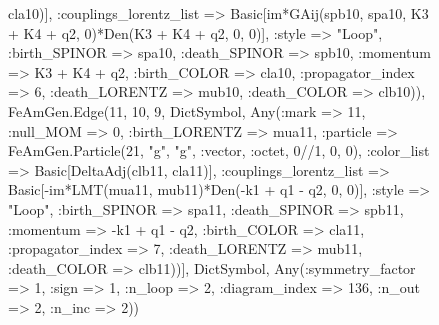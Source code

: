 \documentclass{revtex4}
\begin{document}
\begin{figure}[!htb]
\begin{center}
{cla10)], :couplings_lorentz_list => Basic[im*GAij(spb10, spa10, K3 + K4 + q2, 0)*Den(K3 + K4 + q2, 0, 0)], :style => "Loop", :birth_SPINOR => spa10, :death_SPINOR => spb10, :momentum => K3 + K4 + q2, :birth_COLOR => cla10, :propagator_index => 6, :death_LORENTZ => mub10, :death_COLOR => clb10)), FeAmGen.Edge(11, 10, 9, Dict{Symbol, Any}(:mark => 11, :null_MOM => 0, :birth_LORENTZ => mua11, :particle => FeAmGen.Particle(21, "g", "g", :vector, :octet, 0//1, 0, 0), :color_list => Basic[DeltaAdj(clb11, cla11)], :couplings_lorentz_list => Basic[-im*LMT(mua11, mub11)*Den(-k1 + q1 - q2, 0, 0)], :style => "Loop", :birth_SPINOR => spa11, :death_SPINOR => spb11, :momentum => -k1 + q1 - q2, :birth_COLOR => cla11, :propagator_index => 7, :death_LORENTZ => mub11, :death_COLOR => clb11))], Dict{Symbol, Any}(:symmetry_factor => 1, :sign => 1, :n_loop => 2, :diagram_index => 136, :n_out => 2, :n_inc => 2)) 
}
\end{center}
\end{figure}
\end{document}
